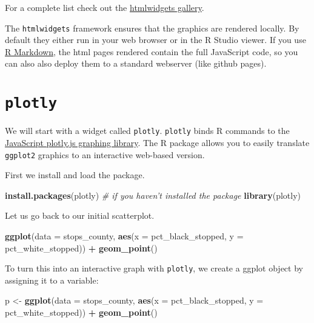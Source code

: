 \documentclass[]{book}
\newenvironment{Shaded}{\begin{snugshade}}{\end{snugshade}}
\newcommand{\KeywordTok}[1]{\textcolor[rgb]{0.13,0.29,0.53}{\textbf{#1}}}
\newcommand{\DataTypeTok}[1]{\textcolor[rgb]{0.13,0.29,0.53}{#1}}
\newcommand{\StringTok}[1]{\textcolor[rgb]{0.31,0.60,0.02}{#1}}
\newcommand{\CommentTok}[1]{\textcolor[rgb]{0.56,0.35,0.01}{\textit{#1}}}
\newcommand{\OperatorTok}[1]{\textcolor[rgb]{0.81,0.36,0.00}{\textbf{#1}}}
\newcommand{\NormalTok}[1]{#1}
\theoremstyle{definition}
\theoremstyle{definition}
\theoremstyle{definition}
\theoremstyle{remark}
\begin{document}
For a complete list check out the
\href{http://gallery.htmlwidgets.org}{htmlwidgets gallery}.

The \texttt{htmlwidgets} framework ensures that the graphics are
rendered locally. By default they either run in your web browser or in
the R Studio viewer. If you use \href{https://rmarkdown.rstudio.com/}{R
Markdown}, the html pages rendered contain the full JavaScript code, so
you can also also deploy them to a standard webserver (like github
pages).

\section{\texorpdfstring{\textbf{\texttt{plotly}}}{plotly}}\label{plotly}

We will start with a widget called \texttt{plotly}. \texttt{plotly}
binds R commands to the \href{https://plot.ly/javascript/}{JavaScript
plotly.js graphing library}. The R package allows you to easily
translate \texttt{ggplot2} graphics to an interactive web-based version.

First we install and load the package.

\begin{Shaded}
\begin{Highlighting}[]
\KeywordTok{install.packages}\NormalTok{(plotly) }\CommentTok{# if you haven't installed the package}
\KeywordTok{library}\NormalTok{(plotly)}
\end{Highlighting}
\end{Shaded}

Let us go back to our initial scatterplot.

\begin{Shaded}
\begin{Highlighting}[]
\KeywordTok{ggplot}\NormalTok{(}\DataTypeTok{data =}\NormalTok{ stops_county, }\KeywordTok{aes}\NormalTok{(}\DataTypeTok{x =}\NormalTok{ pct_black_stopped, }\DataTypeTok{y =}\NormalTok{ pct_white_stopped)) }\OperatorTok{+}
\StringTok{  }\KeywordTok{geom_point}\NormalTok{()}
\end{Highlighting}
\end{Shaded}

To turn this into an interactive graph with \texttt{plotly}, we create a
ggplot object by assigning it to a variable:

\begin{Shaded}
\begin{Highlighting}[]
\NormalTok{p <-}\StringTok{ }\KeywordTok{ggplot}\NormalTok{(}\DataTypeTok{data =}\NormalTok{ stops_county, }\KeywordTok{aes}\NormalTok{(}\DataTypeTok{x =}\NormalTok{ pct_black_stopped, }\DataTypeTok{y =}\NormalTok{ pct_white_stopped)) }\OperatorTok{+}
\StringTok{  }\KeywordTok{geom_point}\NormalTok{()}
\end{Highlighting}
\end{Shaded}
\end{document}

